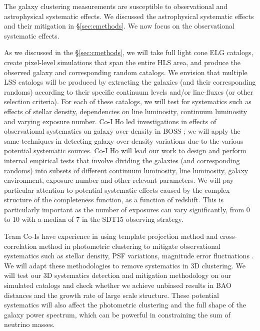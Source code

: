 

The galaxy clustering measurements are susceptible to observational and astrophysical systematic effects. 
We discussed the astrophysical systematic effects and their mitigation in \S\ref{sec:cmethods}.
We now focus on the observational systematic effects.

As we discussed in the \S\ref{sec:cmethods}, we will take full light cone ELG catalogs,
create pixel-level simulations that span the entire HLS area, and produce the
observed galaxy and corresponding random catalogs.  We envision that multiple
LSS catalogs will be produced by extracting the galaxies (and their
corresponding randoms) according to their specific continuum levels
and/or line-fluxes (or other selection criteria). For each of these catalogs, we will
test for systematics such as effects of stellar density, dependencies on line
luminosity, continuum luminosity and varying exposure number. Co-I Ho led
investigations in effects of observational  systematics on galaxy over-density in
BOSS \cite{Ho2012}; we will apply the same techniques in detecting galaxy
over-density variations due to the various potential systematic sources.  
Co-I Ho will lead our work to design and perform internal empirical tests that involve dividing the
galaxies (and corresponding randoms) into subsets of different continuum
luminosity, line luminosity, galaxy environment, exposure number and other
relevant parameters. We will pay particular attention to potential systematic
effects caused by the complex  structure of the completeness function, as a
function of redshift. This is particularly important as the number of exposures
can vary significantly, from 0 to 10 with a median of 7 in the SDT15
observing strategy.

Team Co-Is have experience in using template projection method
and cross-correlation method in photometric clustering to mitigate observational
systematics such as stellar density, PSF variations, magnitude error
fluctuations \cite{Pullen2013,Agarwal2014}.  We will
adapt these methodologies to remove systematics in 3D clustering. We will 
test our 3D systematics detection and mitigation methodology on our
simulated catalogs and check whether we achieve unbiased results
in BAO distances and the growth rate of large scale
structure.  These potential systematics will also affect the photometric
clustering and the full shape of the galaxy power spectrum,
which can be powerful in constraining
the sum of neutrino masses. 

